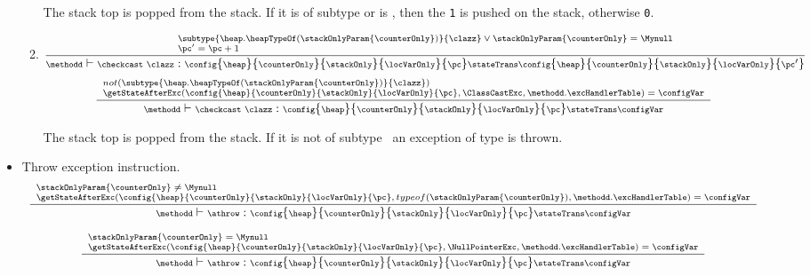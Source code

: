 \begin{itemize}
\begin{enumerate}
	      
	      The stack top is popped from the stack. If it is of subtype \clazz or
	      is \Mynull, then the   \texttt{1} is pushed on the stack, otherwise \texttt{0}. 
         
       	\item \checkcast
          $${\scriptsize \frac{\begin{array}{l}
		               \subtype{\heap.\heapTypeOf( \stackOnlyParam{\counterOnly})}{\clazz }   \vee \stackOnlyParam{\counterOnly} = \Mynull  \\
			      \pc' =  \pc  +1 
		 \end{array}}
		  {\methodd \vdash \checkcast \ \clazz :     \config{\heap}{\counterOnly}{\stackOnly}{\locVarOnly}{\pc} 
		                             \stateTrans  
					     \config{\heap}{\counterOnly}{\stackOnly}{\locVarOnly}{\pc'}} }
	  $$	      
	  $${\scriptsize \frac{\begin{array}{l}	
			       not(\subtype{\heap.\heapTypeOf(  \stackOnlyParam{\counterOnly} ) }{\clazz} )  \\
			       \getStateAfterExc( \config{\heap}{\counterOnly}{\stackOnly}{\locVarOnly}{\pc}, \ClassCastExc,\methodd.\excHandlerTable ) =  \configVar                                              \end{array}}
		  {\methodd \vdash \checkcast \ \clazz :     \config{\heap}{\counterOnly}{\stackOnly}{\locVarOnly}{\pc} 
		                             \stateTrans  
					     \configVar} }  $$



	   The stack top is popped from the stack. If it is not of subtype \clazz \ an exception of type \ClassCastExc is thrown.

	 
   \end{enumerate}

   \item Throw exception instruction. \athrow
            $${\scriptsize \frac{ \begin{array}{l}	 
		             \stackOnlyParam{\counterOnly} \neq \Mynull   \\
			     \getStateAfterExc( \config{\heap}{\counterOnly}{\stackOnly}{\locVarOnly}{\pc},typeof( \stackOnlyParam{\counterOnly} )  ,\methodd.\excHandlerTable ) =  \configVar
		    \end{array}	     
	      }
              {\methodd \vdash \athrow :  \config{\heap}{\counterOnly}{\stackOnly}{\locVarOnly}{\pc} 
		                         \stateTrans  
					 \configVar} } $$

	     $${\scriptsize \frac{ \begin{array}{l}	 
	                     \stackOnlyParam{\counterOnly}  = \Mynull   \\
			     \getStateAfterExc( \config{\heap}{\counterOnly}{\stackOnly}{\locVarOnly}{\pc}, \NullPointerExc  ,\methodd.\excHandlerTable ) =  \configVar
      		    \end{array}	     
	      }
              {\methodd \vdash \athrow :  \config{\heap}{\counterOnly}{\stackOnly}{\locVarOnly}{\pc} 
		                         \stateTrans  
					  \configVar} } $$ 				 


\end{itemize}
